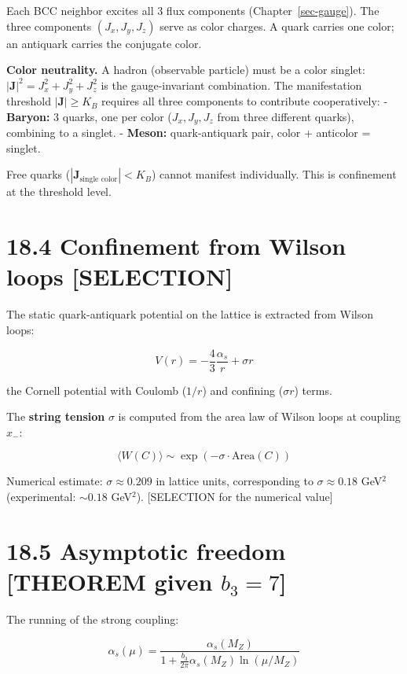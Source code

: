 \documentclass[
  11pt,
  letterpaper,
  twoside,
  openright]{book}
\begin{document}
Each BCC neighbor excites all 3 flux components
(Chapter~\ref{sec-gauge}). The three components \((J_x, J_y, J_z)\)
serve as color charges. A quark carries one color; an antiquark carries
the conjugate color.

\textbf{Color neutrality.} A hadron (observable particle) must be a
color singlet: \(|\mathbf{J}|^2 = J_x^2 + J_y^2 + J_z^2\) is the
gauge-invariant combination. The manifestation threshold
\(|\mathbf{J}| \geq K_B\) requires all three components to contribute
cooperatively: - \textbf{Baryon:} 3 quarks, one per color
(\(J_x, J_y, J_z\) from three different quarks), combining to a singlet.
- \textbf{Meson:} quark-antiquark pair, color + anticolor = singlet.

Free quarks (\(|\mathbf{J}_{\text{single color}}| < K_B\)) cannot
manifest individually. This is confinement at the threshold level.

\section{18.4 Confinement from Wilson loops
{[}SELECTION{]}}\label{confinement-from-wilson-loops-selection}

The static quark-antiquark potential on the lattice is extracted from
Wilson loops:

\[
V(r) = -\frac{4}{3}\frac{\alpha_s}{r} + \sigma r
\tag{18.2}
\]

the Cornell potential with Coulomb (\(1/r\)) and confining
(\(\sigma r\)) terms.

The \textbf{string tension} \(\sigma\) is computed from the area law of
Wilson loops at coupling \(x_-\):

\[
\langle W(C) \rangle \sim \exp(-\sigma \cdot \text{Area}(C))
\tag{18.3}
\]

Numerical estimate: \(\sigma \approx 0.209\) in lattice units,
corresponding to \(\sigma \approx 0.18\) GeV\(^2\) (experimental:
\(\sim 0.18\) GeV\(^2\)). {[}SELECTION for the numerical value{]}

\section{\texorpdfstring{18.5 Asymptotic freedom {[}THEOREM given
\(b_3 = 7\){]}}{18.5 Asymptotic freedom {[}THEOREM given b\_3 = 7{]}}}\label{asymptotic-freedom-theorem-given-b_3-7}

The running of the strong coupling:

\[
\alpha_s(\mu) = \frac{\alpha_s(M_Z)}{1 + \frac{b_3}{2\pi}\alpha_s(M_Z)\ln(\mu/M_Z)}
\tag{18.4}
\]
\end{document}
